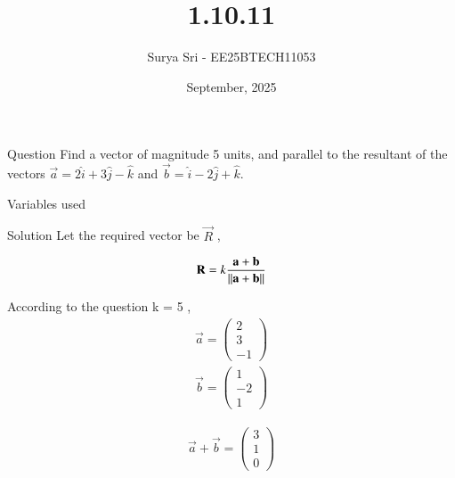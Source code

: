 \documentclass{beamer}
\title 
{1.10.11}
\date{September, 2025}
\author 
{Surya Sri - EE25BTECH11053}
\begin{document}
\frame{\titlepage}
\begin{frame}{Question}
Find a vector of magnitude 5 units, and parallel to the resultant of the vectors $\vec{a} = 2\hat{i} + 3\hat{j} - \hat{k}$ and $\vec{b} = \hat{i} - 2\hat{j} + \hat{k}$.
\end{frame}



\begin{frame}{Variables used}
\begin{table}[H]    
  \centering
  
  \caption{Variables Used}
  \label{tab:1.5.39}
\end{table}

\end{frame}

\begin{frame}{Solution}
Let the required vector be $\vec{R}$ ,

\begin{align}
    \mathbf{R} = k \frac{\mathbf{a} + \mathbf{b}}{\left\lVert\mathbf{a} + \mathbf{b}\right\rVert}
\end{align}

  According to the question k = 5 ,
\begin{align}
     \vec{a} = \begin{pmatrix} 2 \\ 3 \\ -1 \end{pmatrix} 
 \end{align}
 \begin{align}
 \vec{b} = \begin{pmatrix} 1 \\ -2 \\ 1 \end{pmatrix} 
 \end{align}

\begin{align}
\vec{a} + \vec{b} = \begin{pmatrix} 3 \\ 1 \\ 0 \end{pmatrix}
\end{align}

\end{frame}
\end{document}
